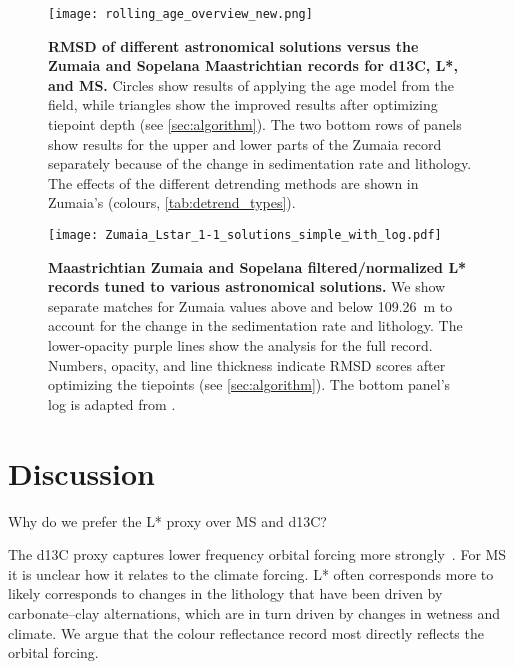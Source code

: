 \documentclass[draft]{agujournal2019}
\begin{document}
\begin{figure}[htb]
  \centering
  \texttt{[image: rolling\_age\_overview\_new.png]}
  \caption{\label{fig:rolling-rmsd}
    \textbf{\gls{RMSD} of different astronomical solutions versus the Zumaia and Sopelana Maastrichtian records for \gls{d13C}, \gls{L*}, and \gls{MS}.}
    Circles show results of applying the age model from the field, while triangles show the improved results after optimizing tiepoint depth (see \cref{sec:algorithm}).
    The two bottom rows of panels show results for the upper and lower parts of the Zumaia record separately because of the change in sedimentation rate and lithology.
    The effects of the different detrending methods are shown in Zumaia's (colours, \cref{tab:detrend_types}).
}
\end{figure}

\begin{figure}[htb]
  \centering
  \texttt{[image: Zumaia\_Lstar\_1-1\_solutions\_simple\_with\_log.pdf]}
  \caption{\label{fig:rolling-depth-age}
    \textbf{Maastrichtian Zumaia and Sopelana filtered/normalized \gls{L*} records tuned to various astronomical solutions.}
    We show separate matches for Zumaia values above and below \qty{109.26}{\metre} to account for the change in the sedimentation rate and lithology.
    The lower-opacity purple lines show the analysis for the full record.
    Numbers, opacity, and line thickness indicate \gls{RMSD} scores after optimizing the tiepoints (see \cref{sec:algorithm}).
    The bottom panel's log is adapted from .
    }
\end{figure}



\section{Discussion}\label{sec:discussion}


Why do we prefer the \gls{L*} proxy over \gls{MS} and \gls{d13C}?

The \gls{d13C} proxy captures lower frequency orbital forcing more strongly~\cite{Zeebe2017,Kocken2019loscar}.
For \gls{MS} it is unclear how it relates to the climate forcing. %
\gls{L*} often corresponds more to likely corresponds to changes in the lithology that have been driven by carbonate--clay alternations, which are in turn driven by changes in wetness and climate.
We argue that the colour reflectance record most directly reflects the orbital forcing.
\end{document}
